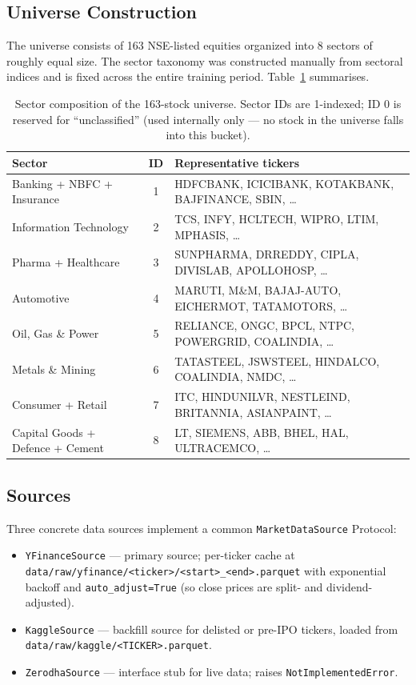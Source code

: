 \documentclass[11pt,a4paper]{article}
\begin{document}
\subsection{Universe Construction}

The universe consists of 163 NSE-listed equities organized into 8 sectors of roughly
equal size. The sector taxonomy was constructed manually from sectoral indices and
is fixed across the entire training period. Table~\ref{tab:universe} summarises.

\begin{table}[h]
\centering
\caption{Sector composition of the 163-stock universe. Sector IDs are 1-indexed; ID 0
is reserved for ``unclassified'' (used internally only --- no stock in the universe
falls into this bucket).}
\label{tab:universe}
\small
\begin{tabularx}{\textwidth}{l c X}
\toprule
\textbf{Sector} & \textbf{ID} & \textbf{Representative tickers} \\
\midrule
Banking + NBFC + Insurance & 1 & HDFCBANK, ICICIBANK, KOTAKBANK, BAJFINANCE, SBIN, \ldots \\
Information Technology & 2 & TCS, INFY, HCLTECH, WIPRO, LTIM, MPHASIS, \ldots \\
Pharma + Healthcare & 3 & SUNPHARMA, DRREDDY, CIPLA, DIVISLAB, APOLLOHOSP, \ldots \\
Automotive & 4 & MARUTI, M\&M, BAJAJ-AUTO, EICHERMOT, TATAMOTORS, \ldots \\
Oil, Gas \& Power & 5 & RELIANCE, ONGC, BPCL, NTPC, POWERGRID, COALINDIA, \ldots \\
Metals \& Mining & 6 & TATASTEEL, JSWSTEEL, HINDALCO, COALINDIA, NMDC, \ldots \\
Consumer + Retail & 7 & ITC, HINDUNILVR, NESTLEIND, BRITANNIA, ASIANPAINT, \ldots \\
Capital Goods + Defence + Cement & 8 & LT, SIEMENS, ABB, BHEL, HAL, ULTRACEMCO, \ldots \\
\bottomrule
\end{tabularx}
\end{table}

\subsection{Sources}

Three concrete data sources implement a common \texttt{MarketDataSource} Protocol:

\begin{itemize}[leftmargin=*]
\item \texttt{YFinanceSource} --- primary source; per-ticker cache at\\
\texttt{data/raw/yfinance/<ticker>/<start>\_<end>.parquet} with exponential backoff
and \texttt{auto\_adjust=True} (so close prices are split- and dividend-adjusted).
\item \texttt{KaggleSource} --- backfill source for delisted or pre-IPO tickers,
loaded from \texttt{data/raw/kaggle/<TICKER>.parquet}.
\item \texttt{ZerodhaSource} --- interface stub for live data; raises
\texttt{NotImplementedError}.
\end{itemize}
\end{document}
